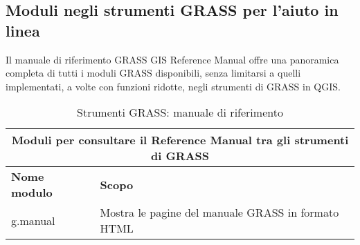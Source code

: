 \subsection{Moduli negli strumenti GRASS per l'aiuto in linea}

Il manuale di riferimento GRASS GIS Reference Manual offre una panoramica completa di tutti i moduli GRASS disponibili, senza limitarsi a quelli implementati, a volte con funzioni ridotte, negli strumenti di GRASS in QGIS. 

\begin{table}[ht]
\centering
\caption{Strumenti GRASS: manuale di riferimento}\medskip
 \begin{tabular}{|p{4cm}|p{12cm}|}
  \hline \multicolumn{2}{|c|}{\textbf{Moduli per consultare il Reference Manual tra gli strumenti di GRASS}} \\
  \hline \textbf{Nome modulo} & \textbf{Scopo} \\
  \hline g.manual & Mostra le pagine del manuale GRASS in formato HTML \\
\hline
\end{tabular}
\end{table}




